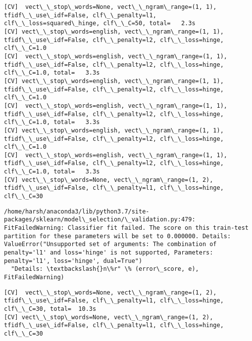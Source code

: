 \documentclass[11pt]{article}
\begin{document}
    \begin{Verbatim}[commandchars=\\\{\}]
[CV]  vect\_\_stop\_words=None, vect\_\_ngram\_range=(1, 1), tfidf\_\_use\_idf=False, clf\_\_penalty=l1, clf\_\_loss=squared\_hinge, clf\_\_C=50, total=   2.3s
[CV] vect\_\_stop\_words=english, vect\_\_ngram\_range=(1, 1), tfidf\_\_use\_idf=False, clf\_\_penalty=l2, clf\_\_loss=hinge, clf\_\_C=1.0 
[CV]  vect\_\_stop\_words=english, vect\_\_ngram\_range=(1, 1), tfidf\_\_use\_idf=False, clf\_\_penalty=l2, clf\_\_loss=hinge, clf\_\_C=1.0, total=   3.3s
[CV] vect\_\_stop\_words=english, vect\_\_ngram\_range=(1, 1), tfidf\_\_use\_idf=False, clf\_\_penalty=l2, clf\_\_loss=hinge, clf\_\_C=1.0 
[CV]  vect\_\_stop\_words=english, vect\_\_ngram\_range=(1, 1), tfidf\_\_use\_idf=False, clf\_\_penalty=l2, clf\_\_loss=hinge, clf\_\_C=1.0, total=   3.3s
[CV] vect\_\_stop\_words=english, vect\_\_ngram\_range=(1, 1), tfidf\_\_use\_idf=False, clf\_\_penalty=l2, clf\_\_loss=hinge, clf\_\_C=1.0 
[CV]  vect\_\_stop\_words=english, vect\_\_ngram\_range=(1, 1), tfidf\_\_use\_idf=False, clf\_\_penalty=l2, clf\_\_loss=hinge, clf\_\_C=1.0, total=   3.3s
[CV] vect\_\_stop\_words=None, vect\_\_ngram\_range=(1, 2), tfidf\_\_use\_idf=False, clf\_\_penalty=l1, clf\_\_loss=hinge, clf\_\_C=30 

    \end{Verbatim}

    \begin{Verbatim}[commandchars=\\\{\}]
/home/harsh/anaconda3/lib/python3.7/site-packages/sklearn/model\_selection/\_validation.py:479: FitFailedWarning: Classifier fit failed. The score on this train-test partition for these parameters will be set to 0.000000. Details: 
ValueError("Unsupported set of arguments: The combination of penalty='l1' and loss='hinge' is not supported, Parameters: penalty='l1', loss='hinge', dual=True")
  "Details: \textbackslash{}n\%r" \% (error\_score, e), FitFailedWarning)

    \end{Verbatim}

    \begin{Verbatim}[commandchars=\\\{\}]
[CV]  vect\_\_stop\_words=None, vect\_\_ngram\_range=(1, 2), tfidf\_\_use\_idf=False, clf\_\_penalty=l1, clf\_\_loss=hinge, clf\_\_C=30, total=  10.3s
[CV] vect\_\_stop\_words=None, vect\_\_ngram\_range=(1, 2), tfidf\_\_use\_idf=False, clf\_\_penalty=l1, clf\_\_loss=hinge, clf\_\_C=30 

    \end{Verbatim}
\end{document}
